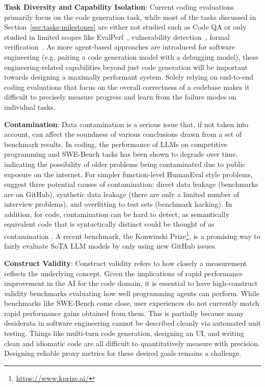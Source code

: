 \textbf{Task Diversity and Capability Isolation}: 
Current coding evaluations primarily focus on the code generation task, while most of the tasks discussed in Section~\ref{sec:tasks-milestones} are either not studied such as Code QA or only studied in limited scopes like EvalPerf~\citep{evalperf}, vulnerability detection~\citep{mei2024arvo}, formal verification~\citep{sun2024clover}. 
As more agent-based approaches are introduced for software engineering (e.g. pairing a code generation model with a debugging model), these engineering-related capabilities beyond just code generation will be important towards designing a maximally performant system. 
Solely relying on end-to-end coding evaluations that focus on the overall correctness of a codebase makes it difficult to precisely measure progress and learn from the failure modes on individual tasks.


\textbf{Contamination}: 
Data contamination is a serious issue that, if not taken into account, can affect the soundness of various conclusions drawn from a set of benchmark results. In coding, the performance of LLMs on competitive programming \citep{xu2024benchmark, jain2024livecodebenchholisticcontaminationfree} and SWE-Bench \citep{aleithan2024swe} tasks has been shown to degrade over time, indicating the possibility of older problems being contaminated due to public exposure on the internet. For simpler function-level HumanEval style problems, \citet{matton2024leakage} suggest three potential causes of contamination: direct data leakage (benchmarks are on GitHub), synthetic data leakage (there are only a limited number of interview problems), and overfitting to test sets (benchmark hacking). In addition, for code, contamination can be hard to detect, as semantically equivalent code that is syntactically distinct could be thought of as contamination \citep{riddell2024quantifying}. A recent benchmark, the Konwinski Prize\footnote{\url{https://www.kprize.ai/}}, is a promising way to fairly evaluate SoTA LLM models by only using new GitHub issues.

\textbf{Construct Validity}:
Construct validity refers to how closely a measurement reflects the underlying concept. 
Given the implications of rapid performance improvement in the AI for the code domain, it is essential to have high-construct validity benchmarks evaluating how well programming agents can perform.
While benchmarks like SWE-Bench come close, user experiences do not currently match rapid performance gains obtained from them. 
This is partially because many desiderata in software engineering cannot be described cleanly via automated unit testing. Things like multi-turn code generation, designing an UI, and writing clean and idiomatic code are all difficult to quantitatively measure with precision. Designing reliable proxy metrics for these desired goals remains a challenge. 

